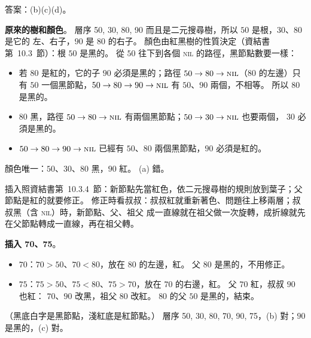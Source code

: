\begin{pastsoln}
答案：(b)(c)(d)。

\textbf{原來的樹和顏色}。 層序 50, 30, 80, 90 而且是二元搜尋樹，所以 $50$ 是根，$30$、$80$ 是它的
左、右子，$90$ 是 $80$ 的右子。 顏色由紅黑樹的性質決定（資結書第~10.3~節）：根 $50$ 是黑的。 從 $50$
往下到各個 \textsc{nil} 的路徑，黑節點數要一樣：
\begin{itemize}
\item 若 $80$ 是紅的，它的子 $90$ 必須是黑的；路徑 $50 \to 80 \to \textsc{nil}$（$80$ 的左邊）只有
$50$ 一個黑節點，$50 \to 80 \to 90 \to \textsc{nil}$ 有 $50$、$90$ 兩個，不相等。 所以 $80$ 是黑的。
\item $80$ 黑，路徑 $50 \to 80 \to \textsc{nil}$ 有兩個黑節點；$50 \to 30 \to \textsc{nil}$ 也要兩個，
$30$ 必須是黑的。
\item $50 \to 80 \to 90 \to \textsc{nil}$ 已經有 $50$、$80$ 兩個黑節點，$90$ 必須是紅的。
\end{itemize}
顏色唯一：$50$、$30$、$80$ 黑，$90$ 紅。 (a) 錯。

插入照資結書第~10.3.4~節：新節點先當紅色，依二元搜尋樹的規則放到葉子；父節點是紅的就要修正。
修正時看叔叔：叔叔紅就重新著色、問題往上移兩層；叔叔黑（含 \textsc{nil}）時，新節點、父、祖父
成一直線就在祖父做一次旋轉，成折線就先在父節點轉成一直線，再在祖父轉。

\textbf{插入 70、75}。
\begin{itemize}
\item $70$：$70 > 50$、$70 < 80$，放在 $80$ 的左邊，紅。 父 $80$ 是黑的，不用修正。
\item $75$：$75 > 50$、$75 < 80$、$75 > 70$，放在 $70$ 的右邊，紅。 父 $70$ 紅，叔叔 $90$ 也紅：
$70$、$90$ 改黑，祖父 $80$ 改紅。 $80$ 的父 $50$ 是黑的，結束。
\end{itemize}
\begin{center}
\end{center}
（黑底白字是黑節點，淺紅底是紅節點。） 層序 50, 30, 80, 70, 90, 75，(b) 對；$90$ 是黑的，(c) 對。


\end{pastsoln}

